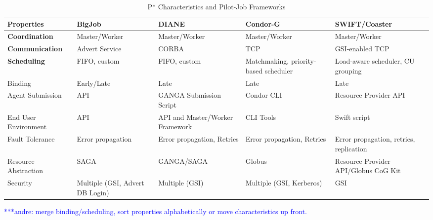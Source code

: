 \documentclass[conference,final]{IEEEtran}
\newcommand{\alnote}[1]{ {\textcolor{blue} { ***andre: #1 }}}
\newcommand{\alnote}[1]{}
\newcommand{\cu}{CU\xspace}
\newcommand{\upp}{\vspace*{-0.5em}}
\begin{document}
\begin{table}[t]
\centering
\begin{tabular}{|l|p{2.5cm}|p{2.5cm}|p{2.5cm}|p{2.5cm}|}
	\hline
	\textbf{Properties}
	&\textbf{BigJob} &\textbf{DIANE} &\textbf{Condor-G} &   
	\textbf{SWIFT/Coaster} \\ \hline

\textbf{Coordination} &Master/Worker  &Master/Worker  &Master/Worker &Master/Worker \\ \hline
	
\textbf{Communication} &Advert Service &CORBA &TCP &GSI-enabled TCP \\ \hline

\textbf{Scheduling} &FIFO, custom &FIFO, custom &Matchmaking, priority-based scheduler 
&Load-aware scheduler, \cu  grouping\\

\hfill Binding &\hfill Early/Late &\hfill Late &\hfill Late &\hfill Late\\


\hline
Agent Submission &API &GANGA Submission Script &Condor CLI 
&Resource Provider API\\

\hline

End User Environment &API &API and Master/Worker Framework &CLI Tools &Swift 
script\\ 

\hline

Fault Tolerance &Error propagation &Error propagation, Retries &Error propagation, Retries &Error propagation, retries, replication\\

\hline

Resource Abstraction &SAGA &GANGA/SAGA &Globus &Resource Provider API/Globus CoG 
Kit \\ 

\hline

Security &Multiple (GSI, Advert DB Login) &Multiple (GSI) &Multiple (GSI, 
Kerberos) &GSI\\ 

\hline


	
\end{tabular}
\caption{P* Characteristics and Pilot-Job Frameworks\upp\upp}
\label{table:pilot-job-comparison}\alnote{merge binding/scheduling, sort 
properties alphabetically or move characteristics up front.}
\end{table}
\end{document}
